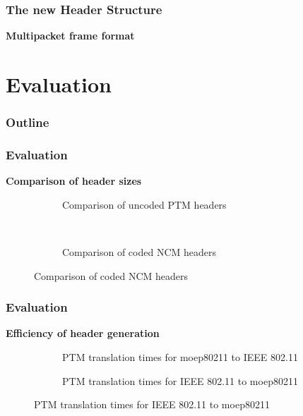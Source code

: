 \documentclass[t]{beamer}
\begin{document}
\begin{frame}
    \frametitle{The new Header Structure}
    \textbf{Multipacket frame format}
    \vspace{0.2cm}
    
    \begin{figure}
    
    \end{figure}

\end{frame}


\section{Evaluation}

\begin{frame}
    \frametitle{Outline}
    \tableofcontents[currentsection]
\end{frame}

\begin{frame}
    \frametitle{Evaluation}
    \textbf{Comparison of header sizes}
   
    \begin{figure}
	\setcounter{subfigure}{0}
	\begin{subfigure}[b]{.8\linewidth}
        
		\caption{Comparison of uncoded PTM headers}
    \end{subfigure}\\
	\vspace{0.8cm}
	\begin{subfigure}[b]{.8\linewidth}
        
		\caption{Comparison of coded NCM headers}
    \end{subfigure}
    \end{figure}


\end{frame}

\begin{frame}
    \frametitle{Evaluation}
    \textbf{Efficiency of header generation}

    \begin{figure}
	\setcounter{subfigure}{0}
		\centering
		\begin{subfigure}[b]{.45\linewidth}
			\scalebox{.6}{}
			\caption{PTM translation times for moep80211 to IEEE 802.11}
		\end{subfigure}
		\begin{subfigure}[b]{.45\linewidth}
			\scalebox{.6}{}
			\caption{PTM translation times for IEEE 802.11 to moep80211}
		\end{subfigure}
    \end{figure}

\end{frame}
\end{document}
